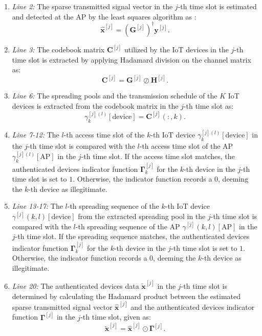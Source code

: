 \documentclass[journal,10pt]{IEEEtran}
\begin{document}
\begin{enumerate}
    \item \textit{Line 2:} The sparse transmitted signal vector in the $j$-th time slot is estimated and detected at the AP by the least squares algorithm as \cite{wang2016dynamic}:
    \begin{equation}
        \hat{\mathbf{x}}^{[j]} = \left( \mathbf{G}^{[j]} \right)^\dagger \mathbf{y}^{[j]}.
    \end{equation}
    
    
    \item \textit{Line 3:} The codebook matrix $\mathbf{C}^{[j]}$ utilized by the IoT devices in the $j$-th time slot is extracted by applying Hadamard division on the channel matrix as:
    \begin{equation}
        \mathbf{C}^{[j]} = \mathbf{G}^{[j]} \oslash \mathbf{H}^{[j]}.
    \end{equation}
    
    
    \item \textit{Line 6:} The spreading pools and the transmission schedule of the $K$ IoT devices is extracted from the codebook matrix in the $j$-th time slot as:
    \begin{equation}
        \gamma_k^{[j](l)}[\text{device}] = \mathbf{C}^{[j]}(:,k).
    \end{equation}
    
    
    \item \textit{Line 7-12:} The $l$-th access time slot of the $k$-th IoT device $\gamma_k^{[j](l)} [\text{device}]$ in the $j$-th time slot is compared with the $l$-th access time slot of the AP $\gamma_k^{[j](l)} [\text{AP}]$ in the $j$-th time slot. If the access time slot matches, the authenticated devices indicator function $\mathbf{\Gamma}^{[j]}_k$ for the $k$-th device in the $j$-th time slot is set to $1$. Otherwise, the indicator function records a $0$, deeming the $k$-th device as illegitimate. 
    
    
    \item \textit{Line 13-17:} The $l$-th spreading sequence of the $k$-th IoT device $\gamma^{[j]}(k,l) [\text{device}]$ from the extracted spreading pool in the $j$-th time slot is compared with the $l$-th spreading sequence of the AP $\gamma^{[j]} (k,l) [\text{AP}]$ in the $j$-th time slot. If the spreading sequence matches, the authenticated devices indicator function $\mathbf{\Gamma}^{[j]}_k$ for the $k$-th device in the $j$-th time slot is set to $1$. Otherwise, the indicator function records a $0$, deeming the $k$-th device as illegitimate. 
    
    
    \item \textit{Line 20:} The authenticated devices data $\tilde{\mathbf{x}}^{[j]}$ in the $j$-th time slot is determined by calculating the Hadamard product between the estimated sparse transmitted signal vector $\hat{\mathbf{x}}^{[j]}$ and the authenticated devices indicator function $\mathbf{\Gamma}^{[j]}$ in the $j$-th time slot, given as:
    \begin{equation}
        \tilde{\mathbf{x}}^{[j]} = \hat{\mathbf{x}}^{[j]}  \odot \mathbf{\Gamma}^{[j]}.
    \end{equation}
    \end{enumerate}
\end{document}
